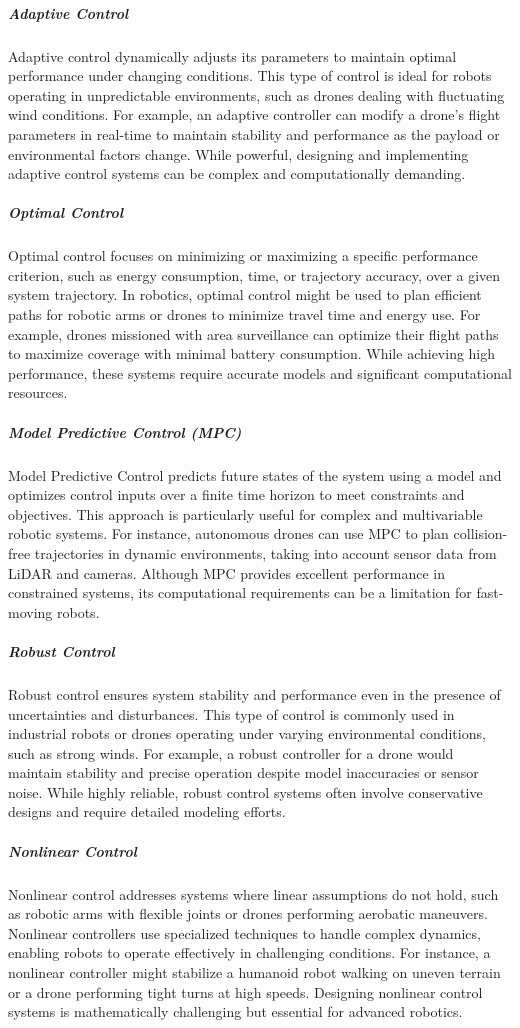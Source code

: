 \documentclass{book}
\begin{document}
\subparagraph{Adaptive Control}
Adaptive control dynamically adjusts its parameters to maintain optimal performance under changing conditions. This type of control is ideal for robots operating in unpredictable environments, such as drones dealing with fluctuating wind conditions. For example, an adaptive controller can modify a drone's flight parameters in real-time to maintain stability and performance as the payload or environmental factors change. While powerful, designing and implementing adaptive control systems can be complex and computationally demanding.

\subparagraph{Optimal Control}
Optimal control focuses on minimizing or maximizing a specific performance criterion, such as energy consumption, time, or trajectory accuracy, over a given system trajectory. In robotics, optimal control might be used to plan efficient paths for robotic arms or drones to minimize travel time and energy use. For example, drones missioned with area surveillance can optimize their flight paths to maximize coverage with minimal battery consumption. While achieving high performance, these systems require accurate models and significant computational resources.

\subparagraph{Model Predictive Control (MPC)}
Model Predictive Control predicts future states of the system using a model and optimizes control inputs over a finite time horizon to meet constraints and objectives. This approach is particularly useful for complex and multivariable robotic systems. For instance, autonomous drones can use MPC to plan collision-free trajectories in dynamic environments, taking into account sensor data from LiDAR and cameras. Although MPC provides excellent performance in constrained systems, its computational requirements can be a limitation for fast-moving robots.

\subparagraph{Robust Control}
Robust control ensures system stability and performance even in the presence of uncertainties and disturbances. This type of control is commonly used in industrial robots or drones operating under varying environmental conditions, such as strong winds. For example, a robust controller for a drone would maintain stability and precise operation despite model inaccuracies or sensor noise. While highly reliable, robust control systems often involve conservative designs and require detailed modeling efforts.

\subparagraph{Nonlinear Control}
Nonlinear control addresses systems where linear assumptions do not hold, such as robotic arms with flexible joints or drones performing aerobatic maneuvers. Nonlinear controllers use specialized techniques to handle complex dynamics, enabling robots to operate effectively in challenging conditions. For instance, a nonlinear controller might stabilize a humanoid robot walking on uneven terrain or a drone performing tight turns at high speeds. Designing nonlinear control systems is mathematically challenging but essential for advanced robotics.
\end{document}
